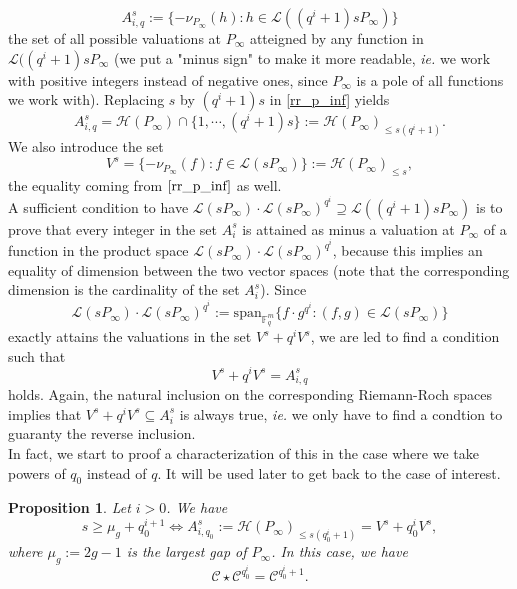 \documentclass[a4paper]{article}
\newtheorem{prop1}{Proposition}
\newcommand{\calH}{\mathcal{H}}
\newcommand{\calL}{\mathcal{L}}
\newcommand{\calC}{\mathcal{C}}
\begin{document}
\[A^s_{i,q}:=\{-\nu_{P_{\infty}}(h) : h \in \calL((q^i+1)sP_{\infty}) \}\] 
the set of all possible valuations at $P_{\infty}$ atteigned by any function in $\calL((q^i+1)sP_{\infty}$ (we put a "minus sign" to make it more readable, \emph{ie.} we work with positive integers instead of negative ones, since $P_{\infty}$ is a pole of all functions we work with). Replacing $s$ by $(q^i+1)s$ in \eqref{rr_p_inf} yields
\[A^s_{i,q} = \calH(P_{\infty}) \cap \{1,\cdots,(q^i+1)s\} := \calH(P_{\infty})_{\leq s(q^i+1)}.\]
 We also introduce the set 
\[V^s = \{-\nu_{P_{\infty}}(f) : f \in \calL(sP_{\infty})\} := \calH(P_{\infty})_{\leq s},\]
the equality coming from $\eqref{rr_p_inf}$ as well. \\
A sufficient condition to have $\calL(sP_{\infty}) \cdot \calL(sP_{\infty})^{q^i} \supseteq \calL((q^i+1)sP_{\infty})$ is to prove that every integer in the set $A_i^s$ is attained as minus a valuation at $P_{\infty}$ of a function in the product space $\calL(sP_{\infty}) \cdot \calL(sP_{\infty})^{q^i}$, because this implies an equality of dimension between the two vector spaces (note that the corresponding dimension is the cardinality of the set $A_i^s$). Since 
\[\calL(sP_{\infty}) \cdot \calL(sP_{\infty})^{q^i} := \mathrm{span}_{\mathbb{F}_q^m}\{f \cdot g^{q^i} : (f,g) \in \calL(sP_{\infty})\}\]
exactly attains the valuations in the set $V^s+q^iV^s$,
we are led to find a condition such that 
\begin{equation} \label{equalitu_of_valuations}
    V^s+q^iV^s = A^s_{i,q}
\end{equation}
holds. Again, the natural inclusion on the corresponding Riemann-Roch spaces implies that  $V^s+q^iV^s \subseteq A^s_i$ is always true, \emph{ie.} we only have to find a condtion to guaranty the reverse inclusion. \\
In fact, we start to proof a characterization of this in the case where we take powers of $q_0$ instead of $q$. It will be used later to get back to the case of interest.

\begin{prop1} \label{result_with_valuations}
Let $i > 0$. We have 
\[s \geq \mu_g + q_0^{i+1} \iff A^s_{i,q_0} := \calH(P_{\infty})_{\leq s(q_0^i+1)} = V^s+q_0^iV^s,\]
 where $\mu_g := 2g-1$ is the largest gap of $P_{\infty}$. In this case, we have 
 \[ \calC \star \calC^{q_0^i} = \calC^{q_0^i+1}.\]
\end{prop1}
\end{document}
